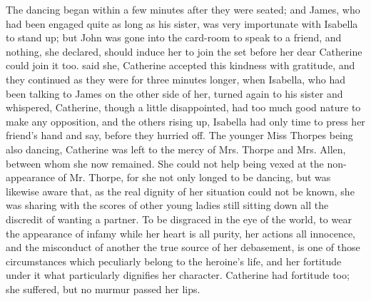 The dancing began within a few minutes after they were seated; and James, who had been engaged quite as long as his sister, was very importunate with Isabella to stand up; but John was gone into the card-room to speak to a friend, and nothing, she declared, should induce her to join the set before her dear Catherine could join it too.  said she,  Catherine accepted this kindness with gratitude, and they continued as they were for three minutes longer, when Isabella, who had been talking to James on the other side of her, turned again to his sister and whispered,  Catherine, though a little disappointed, had too much good nature to make any opposition, and the others rising up, Isabella had only time to press her friend's hand and say,  before they hurried off. The younger Miss Thorpes being also dancing, Catherine was left to the mercy of Mrs. Thorpe and Mrs. Allen, between whom she now remained. She could not help being vexed at the non-appearance of Mr. Thorpe, for she not only longed to be dancing, but was likewise aware that, as the real dignity of her situation could not be known, she was sharing with the scores of other young ladies still sitting down all the discredit of wanting a partner. To be disgraced in the eye of the world, to wear the appearance of infamy while her heart is all purity, her actions all innocence, and the misconduct of another the true source of her debasement, is one of those circumstances which peculiarly belong to the heroine's life, and her fortitude under it what particularly dignifies her character. Catherine had fortitude too; she suffered, but no murmur passed her lips.

